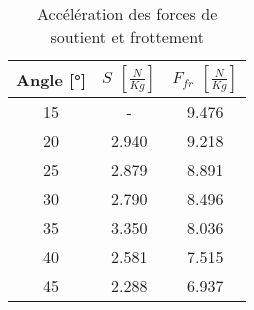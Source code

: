 \begin{table}
\centering
\begin{tabular}{|c|c|c|}
\hline
Angle [°] &$S$ $\left[ \frac{N}{Kg} \right]$ & $F_{fr}$ $\left[ \frac{N}{Kg} \right]$ \\
           \hline
15        &- & 9.476 \\
           \hline
20        &2.940 & 9.218 \\
           \hline
25        &2.879 & 8.891 \\
           \hline
30        &2.790 & 8.496 \\
           \hline
35        &3.350 & 8.036 \\
           \hline
40        &2.581 & 7.515 \\
           \hline
45        &2.288 & 6.937 \\
           \hline
\end{tabular}
\caption{Accélération des forces de soutient et frottement}
\label{table:v-aee}
\end{table}
